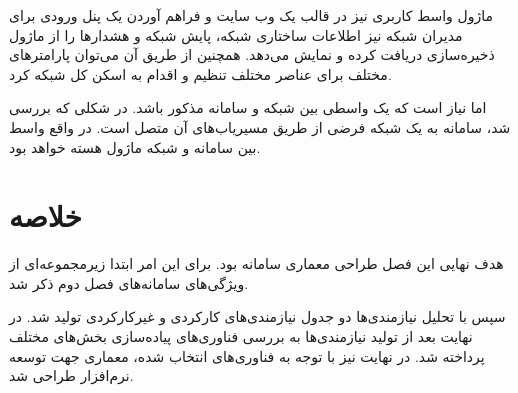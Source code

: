 ماژول واسط کاربری نیز در قالب یک وب سایت و فراهم آوردن یک پنل ورودی برای مدیران شبکه نیز اطلاعات ساختاری شبکه، پایش شبکه و هشدارها را از ماژول ذخیره‌سازی دریافت کرده و نمایش می‌دهد. همچنین از طریق آن می‌توان پارامترهای مختلف برای عناصر مختلف تنظیم و اقدام به اسکن کل شبکه کرد.

اما نیاز است که یک واسطی بین شبکه و سامانه مذکور باشد. در شکلی که بررسی شد، سامانه به یک شبکه فرضی از طریق مسیریاب‌های آن متصل است. در واقع واسط بین سامانه و شبکه ماژول هسته  خواهد بود.






\section{خلاصه}


هدف نهایی این فصل طراحی معماری سامانه بود. برای این امر ابتدا زیرمجموعه‌ای از ویژگی‌های سامانه‌های فصل دوم ذکر شد.

سپس با تحلیل نیازمندی‌ها دو جدول نیازمندی‌های کارکردی و غیرکارکردی تولید شد. در نهایت بعد از تولید نیازمندی‌ها به بررسی فناوری‌های پیاده‌سازی بخش‌های مختلف پرداخته شد. در نهایت نیز با توجه به فناوری‌های انتخاب شده، معماری جهت توسعه نرم‌افزار طراحی شد.

